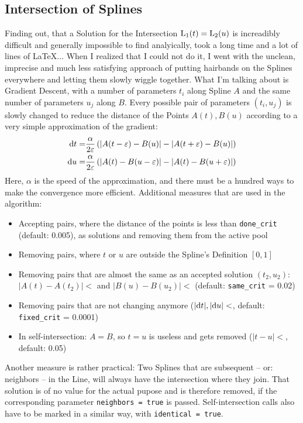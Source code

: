 \subsection{Intersection of Splines}
    Finding out, that a Solution for the Intersection $\operatorname{L}_1(t) = \operatorname{L}_2(u)$ is increadibly difficult and generally impossible to find analyically, took a long time and a lot of lines of \LaTeX... When I realized that I could not do it, I went with the unclean, imprecise and much less satisfying approach of putting hairbands on the Splines everywhere and letting them slowly wiggle together. What I'm talking about is Gradient Descent, with a number of parameters $t_i$ along Spline $A$ and the same number of parameters $u_j$ along $B$. Every possible pair of parameters $(t_i, u_j)$ is slowly changed to reduce the distance of the Points $A(t), B(u)$ according to a very simple approximation of the gradient:
    $$\begin{aligned}
        {\rm d}{}t =& \frac{\alpha}{2\varepsilon} \left(\left|A(t-\varepsilon) - B(u)\right| - \left|A(t+\varepsilon) - B(u)\right|\right)\\
        {\rm d}{}u =& \frac{\alpha}{2\varepsilon} \left(\left|A(t) - B(u-\varepsilon)\right| - \left|A(t) - B(u+\varepsilon)\right|\right) \\
    \end{aligned}$$
    Here, $\alpha$ is the speed of the approximation, and there must be a hundred ways to make the convergence more efficient. Additional measures that are used in the algorithm:
    \begin{itemize}
        \item Accepting pairs, where the distance of the points is less than {\tt done\_crit} (default: 0.005), as solutions and removing them from the active pool
        \item Removing pairs, where $t$ or $u$ are outside the Spline's Definition $[0, 1]$
        \item Removing pairs that are almost the same as an accepted solution $(t_2, u_2)$: $|A(t) - A(t_2)| < $\phantom{.}{\tt same\_crit} and $|B(u) - B(u_2)| < $\phantom{.}{\tt same\_crit} (default: {\tt same\_crit} = 0.02)
        \item Removing pairs that are not changing anymore ($|{\rm d}{}t|, |{\rm d}{}u| < $\phantom{.}{\tt fixed\_crit}, default: {\tt fixed\_crit} = 0.0001)
        \item In self-intersection: $A = B$, so $t = u$ is useless and gets removed ($|t - u| < $\phantom{.}{\tt identical\_crit}, default: 0.05)
    \end{itemize}
    Another measure is rather practical: Two Splines that are subsequent – or: neighbors – in the Line, will always have the intersection where they join. That solution is of no value for the actual pupose and is therefore removed, if the corresponding parameter {\tt neighbors = true} is passed. Self-intersection calls also have to be marked in a similar way, with {\tt identical = true}.
